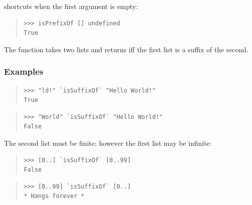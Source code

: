 \begin{haddockdesc}
{\begin{quote}
{\begin{verbatim}
\end{verbatim}}
\end{quote}
 shortcuts when the first argument is empty:\par
\begin{quote}
{\haddockverb\begin{verbatim}
>>> isPrefixOf [] undefined
True

\end{verbatim}}
\end{quote}}
\end{haddockdesc}
\begin{haddockdesc}
\item[\begin{tabular}{@{}l}
isSuffixOf :: Eq a => {\char 91}a{\char 93} -> {\char 91}a{\char 93} -> Bool
\end{tabular}]
{\haddockbegindoc
The  function takes two lists and returns  iff
 the first list is a suffix of the second.\par
\subsubsection*{\textbf{Examples}}
\begin{quote}
{\haddockverb\begin{verbatim}
>>> "ld!" `isSuffixOf` "Hello World!"
True

\end{verbatim}}
\end{quote}
\begin{quote}
{\haddockverb\begin{verbatim}
>>> "World" `isSuffixOf` "Hello World!"
False

\end{verbatim}}
\end{quote}
The second list must be finite; however the first list may be infinite:\par
\begin{quote}
{\haddockverb\begin{verbatim}
>>> [0..] `isSuffixOf` [0..99]
False

\end{verbatim}}
\end{quote}
\begin{quote}
{\haddockverb\begin{verbatim}
>>> [0..99] `isSuffixOf` [0..]
* Hangs forever *

\end{verbatim}}
\end{quote}}
\end{haddockdesc}

